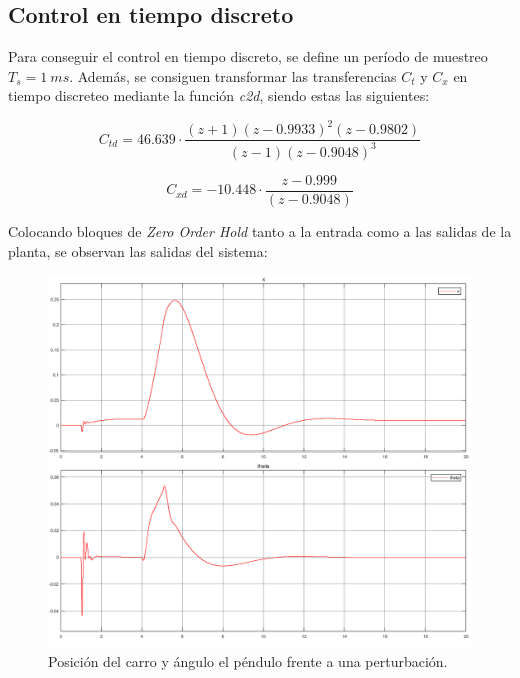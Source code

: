 \subsection{Control en tiempo discreto}
\label{sec:ls_discreto}

Para conseguir el control en tiempo discreto, se define un período de muestreo $T_s = 1 \ ms$. Además, se consiguen transformar las transferencias $C_t$ y $C_x$ en tiempo discreteo mediante la función \textit{c2d}, siendo estas las siguientes:
\begin{multicols}{2}
\begin{equation*}
	C_{td} = 46.639 \cdot \frac{(z + 1)(z - 0.9933)^2(z - 0.9802)}{(z - 1) (z - 0.9048)^3}
\end{equation*}

\begin{equation*}
	C_{xd} = -10.448 \cdot \frac{z - 0.999}{(z - 0.9048)}
\end{equation*}
\end{multicols}

Colocando bloques de \textit{Zero Order Hold} tanto a la entrada como a las salidas de la planta, se observan las salidas del sistema:
\begin{figure}[H]
	\centering
	\includegraphics[width=0.9\linewidth]{ImagenesLoop Shaping/salida}
	\caption{Posición del carro y ángulo el péndulo frente a una perturbación.}	
	\label{fig:salida}
\end{figure}


%